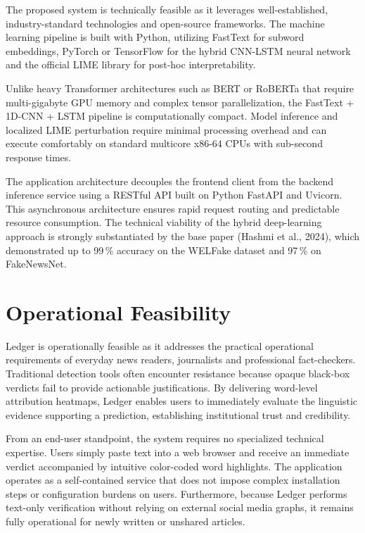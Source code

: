 \documentclass[12pt,a4paper,oneside]{report}
\begin{document}
The proposed system is technically feasible as it leverages well-established, industry-standard
technologies and open-source frameworks. The machine learning pipeline is built with Python,
utilizing FastText for subword embeddings, PyTorch or TensorFlow for the hybrid CNN-LSTM neural
network and the official LIME library for post-hoc interpretability.

Unlike heavy Transformer architectures such as BERT or RoBERTa that require multi-gigabyte GPU
memory and complex tensor parallelization, the FastText + 1D-CNN + LSTM pipeline is computationally
compact. Model inference and localized LIME perturbation require minimal processing overhead and
can execute comfortably on standard multicore x86-64 CPUs with sub-second response times.

The application architecture decouples the frontend client from the backend inference service
using a RESTful API built on Python FastAPI and Uvicorn. This asynchronous architecture ensures
rapid request routing and predictable resource consumption. The technical viability of the hybrid
deep-learning approach is strongly substantiated by the base paper (Hashmi et al., 2024), which
demonstrated up to 99\,\% accuracy on the WELFake dataset and 97\,\% on FakeNewsNet.

\section{Operational Feasibility}

Ledger is operationally feasible as it addresses the practical operational requirements of
everyday news readers, journalists and professional fact-checkers. Traditional detection tools
often encounter resistance because opaque black-box verdicts fail to provide actionable justifications.
By delivering word-level attribution heatmaps, Ledger enables users to immediately evaluate the
linguistic evidence supporting a prediction, establishing institutional trust and credibility.

From an end-user standpoint, the system requires no specialized technical expertise. Users simply
paste text into a web browser and receive an immediate verdict accompanied by intuitive color-coded
word highlights. The application operates as a self-contained service that does not impose complex
installation steps or configuration burdens on users. Furthermore, because Ledger performs
text-only verification without relying on external social media graphs, it remains fully operational
for newly written or unshared articles.
\end{document}
